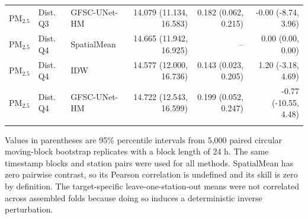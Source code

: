\begin{table}[t]
\begin{tabular}{lllrrr}
$\mathrm{PM}_{2.5}$ & Dist. Q3 & GFSC-UNet-HM & 14.079 (11.134, 16.583) & 0.182 (0.062, 0.215) & -0.00 (-8.74, 3.96) \\
\addlinespace
$\mathrm{PM}_{2.5}$ & Dist. Q4 & SpatialMean & 14.665 (11.942, 16.925) & -- & 0.00 (0.00, 0.00) \\
$\mathrm{PM}_{2.5}$ & Dist. Q4 & IDW & 14.577 (12.000, 16.736) & 0.143 (0.023, 0.205) & 1.20 (-3.18, 4.69) \\
$\mathrm{PM}_{2.5}$ & Dist. Q4 & GFSC-UNet-HM & 14.722 (12.543, 16.599) & 0.199 (0.052, 0.247) & -0.77 (-10.55, 4.48) \\
\addlinespace
\bottomrule
\end{tabular}
\vspace{2pt}
\parbox{0.98\textwidth}{\footnotesize Values in parentheses are 95\% percentile intervals from 5,000 paired circular moving-block bootstrap replicates with a block length of 24 h. The same timestamp blocks and station pairs were used for all methods. SpatialMean has zero pairwise contrast, so its Pearson correlation is undefined and its skill is zero by definition. The target-specific leave-one-station-out means were not correlated across assembled folds because doing so induces a deterministic inverse perturbation.}
\end{table}
